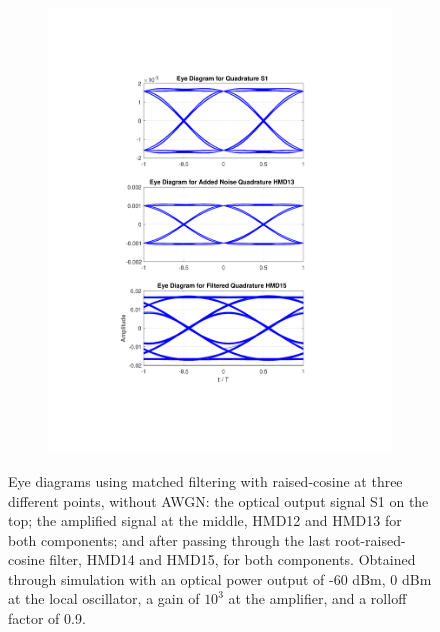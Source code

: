 \begin{figure}[H]
\begin{subfigure}{.45\textwidth}
		\includegraphics[clip, trim=5cm 4cm 5cm 4cm, width=\textwidth]{./sdf/m_qam_system/figures/eyes/q_nn_p_60_09_rc.pdf}
	\end{subfigure}
	
	\caption{Eye diagrams using matched filtering with raised-cosine at three different points, without AWGN: the optical output signal S1 on the top; the amplified signal at the middle, HMD12 and HMD13 for both components; and after passing through the last root-raised-cosine filter, HMD14 and HMD15, for both components. Obtained through simulation with an optical power output of -60 dBm, 0 dBm at the local oscillator, a gain of $10^3$ at the amplifier, and a rolloff factor of 0.9.\label{fig:eyes_nn_rc_09}}
	
\end{figure}

